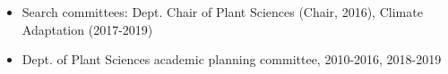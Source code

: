 \begin{itemize}
\item Search committees: Dept. Chair of Plant Sciences (Chair, 2016), Climate Adaptation (2017-2019)
\item Dept. of Plant Sciences academic planning committee, 2010-2016, 2018-2019


\end{itemize}
